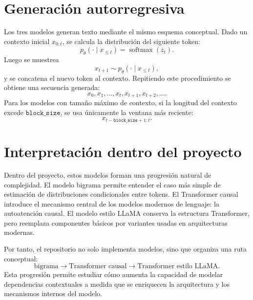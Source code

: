\documentclass[11pt]{report}
\theoremstyle{definition}
\theoremstyle{plain}
\numberwithin{equation}{section}
\begin{document}
\section{Generación autorregresiva}

Los tres modelos generan texto mediante el mismo esquema conceptual. Dado un contexto inicial \(x_{0:t}\), se calcula la distribución del siguiente token:
\begin{equation*}
    p_\theta(\cdot\mid x_{\leq t})
    =
    \operatorname{softmax}(z_t).
\end{equation*}
Luego se muestrea
\begin{equation*}
    x_{t+1}
    \sim
    p_\theta(\cdot\mid x_{\leq t}),
\end{equation*}
y se concatena el nuevo token al contexto. Repitiendo este procedimiento se obtiene una secuencia generada:
\begin{equation*}
    x_0,x_1,\ldots,x_t,x_{t+1},x_{t+2},\ldots.
\end{equation*}
Para los modelos con tamaño máximo de contexto, si la longitud del contexto excede \(\texttt{block\_size}\), se usa únicamente la ventana más reciente:
\begin{equation*}
    x_{t-\texttt{block\_size}+1:t}.
\end{equation*}

\section{Interpretación dentro del proyecto}

Dentro del proyecto, estos modelos forman una progresión natural de complejidad. El modelo bigrama permite entender el caso más simple de estimación de distribuciones condicionales entre tokens. El Transformer causal introduce el mecanismo central de los modelos modernos de lenguaje: la autoatención causal. El modelo estilo LLaMA conserva la estructura Transformer, pero reemplaza componentes básicos por variantes usadas en arquitecturas modernas.

Por tanto, el repositorio no solo implementa modelos, sino que organiza una ruta conceptual:
\begin{equation*}
    \text{bigrama}
    \longrightarrow
    \text{Transformer causal}
    \longrightarrow
    \text{Transformer estilo LLaMA}.
\end{equation*}
Esta progresión permite estudiar cómo aumenta la capacidad de modelar dependencias contextuales a medida que se enriquecen la arquitectura y los mecanismos internos del modelo.
\end{document}
